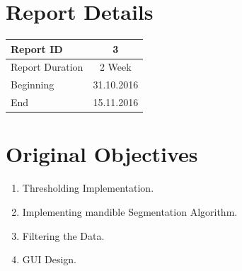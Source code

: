 \documentclass[10pt, b5paper]{article}
\begin{document}
\title{\rmfamily\normalfont{}}

\author{{\small Automatic Mandible Segmentation Using VTK}}

\date{\footnotesize{\today}}

\maketitle

% 
 


\section{Report Details}
\begin{center}
\begin{tabular}{ l | c }
\hline 
Report ID & 3  \\ %
\hline 
Report Duration & 2 Week \\ %
\hline 
Beginning & 31.10.2016 \\ %
\hline 
End & 15.11.2016 \\ %
\hline 
\end{tabular}
\end{center}

\section{Original Objectives}
\begin{enumerate}
\item Thresholding Implementation.
\item Implementing mandible Segmentation Algorithm.
\item Filtering the Data.
\item GUI Design.
\end{enumerate}
\end{document}
